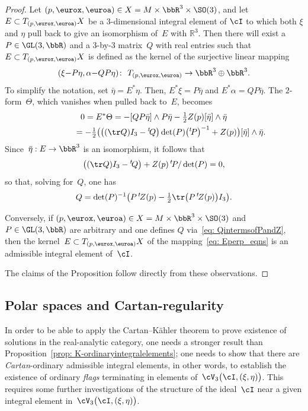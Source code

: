\begin{proof}
Let $(p,\eurox,\euroa)\in X=M\times\bbR^3\times\SO(3)$, and
let $E\subset T_{(p,\eurox,\euroa)} X$ be a $3$-dimensional integral element of $\cI$
to which both $\xi$ and $\eta$ pull back to give an isomorphism of~$E$
with $\mathbb{R}^3$. Then there will exist a $P\in\GL(3,\bbR)$
and a $3$-by-$3$ matrix~$Q$ with real entries
such that $E\subset T_{(p,\eurox,\euroa)} X$ is defined as the kernel of the surjective linear mapping
\begin{gather}\label{eq: Eperp_eqns}
(\xi{-}P \eta, \alpha{-}QP \eta)\colon \ T_{(p,\eurox,\euroa)}\to\bbR^3\oplus\bbR^3.
\end{gather}
To simplify the notation, set $\bar\eta = E^*\eta$.
Then, $E^*\xi = P\bar\eta$ and $E^*\alpha = QP\bar\eta$.
The $2$-form~$\Theta$, which vanishes
when pulled back to~$E$, becomes
\begin{gather*}
0 = E^*\Theta= -[QP \bar\eta]\wedge P \bar\eta-\tfrac12 Z(p) [\bar\eta]\wedge\bar\eta\\
\hphantom{0 = E^*\Theta}{} = -\tfrac12\bigl(\bigl((\tr Q)I_3-{}^t\!Q\bigr)\det(P)\big({}^t\!P\big)^{-1}
 + Z(p)\bigr) [\bar\eta]\wedge\bar\eta.
\end{gather*}
Since~$\bar\eta:E\to\bbR^3$ is an isomorphism, it follows that
\begin{gather*}
\bigl((\tr Q)I_3 - {}^t\!Q\bigr) + Z(p) \,{}^t\!P/\det(P) = 0,
\end{gather*}
so that, solving for~$Q$, one has
\begin{gather}\label{eq: QintermsofPandZ}
Q = \det(P)^{-1}\big(P \, {}^t\!Z(p) - \tfrac12 \tr\bigl(P\, {}^t\!Z(p)\bigr) I_3\big).
\end{gather}

Conversely, if $(p,\eurox,\euroa)\in X=M\times\bbR^3\times\SO(3)$
and~$P\in\GL(3,\bbR)$ are arbitrary
and one defines $Q$ via~\eqref{eq: QintermsofPandZ},
then the kernel~$E\subset T_{(p,\eurox,\euroa)}X$
of the mapping~\eqref{eq: Eperp_eqns}
is an admissible integral element of~$\cI$.

The claims of the Proposition follow directly from these observations.
\end{proof}

\subsection{Polar spaces and Cartan-regularity}
In order to be able to apply the Cartan--K\"ahler theorem to prove existence of solutions in the real-analytic category, one needs a stronger result than Proposition~\ref{prop: K-ordinaryintegralelements}; one needs to show that there are \emph{Cartan}-ordinary admissible integral elements, in other words, to establish the existence of ordinary \emph{flags} terminating in elements of~$\cV_3\bigl(\cI,(\xi,\eta)\bigr)$. This requires some further investigations of the structure of the ideal~$\cI$ near a given integral element in~$\cV_3\bigl(\cI,(\xi,\eta)\bigr)$.

